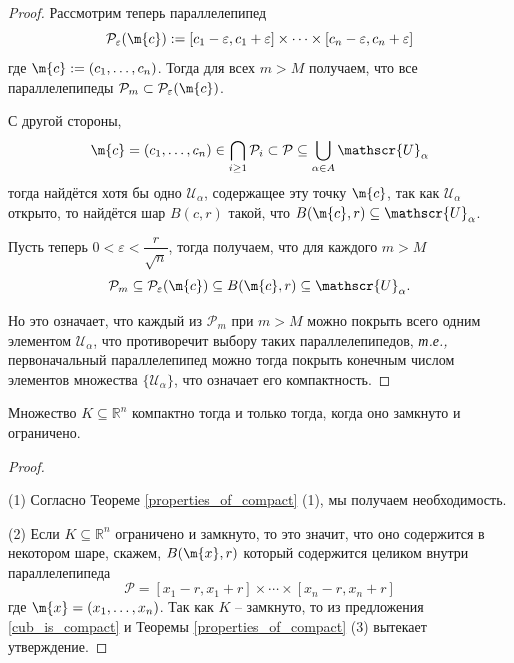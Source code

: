 \begin{proof}
Рассмотрим теперь параллелепипед
\[
 \mathcal{P}_\varepsilon(\m{c}):= [c_1 - \varepsilon, c_1 + \varepsilon] \times \cdots \times [c_n - \varepsilon, c_n + \varepsilon]
\]
где $\m{c}: = (c_1,\ldots, c_n)$. Тогда для всех $m>M$ получаем, что все параллелепипеды $\mathcal{P}_m \subset \mathcal{P}_\varepsilon(\m{c})$.

С другой стороны, 
\[
  \m{c} = (c_1,\ldots, c_n) \in \bigcap_{i \ge 1} \mathcal{P}_i \subset \mathcal{P} \subseteq \bigcup_{\alpha \in A} \mathscr{U}_\alpha
\]
тогда найдётся хотя бы одно $\mathscr{U}_\alpha$, содержащее эту точку $\m{c}$, так как $\mathscr{U}_\alpha$ открыто, то найдётся шар $B(c, r)$ такой, что $B(\m{c}, r) \subseteq \mathscr{U}_\alpha$.

Пусть теперь $0 < \varepsilon < \dfrac{r}{\sqrt{n}}$, тогда получаем, что для каждого $m>M$
\[
 \mathcal{P}_m \subseteq \mathcal{P}_\varepsilon(\m{c}) \subseteq B(\m{c}, r) \subseteq \mathscr{U}_\alpha.
\]

Но это означает, что каждый из $\mathcal{P}_m$ при $m >M$ можно покрыть всего одним элементом $\mathscr{U}_\alpha$, что противоречит выбору таких параллелепипедов, \textit{т.е.,} первоначальный параллелепипед можно тогда покрыть конечным числом элементов множества $\{\mathscr{U}_\alpha\}$, что означает его компактность.    
\end{proof}


\begin{theorem}\label{criterai_of_compacness}
Множество $K \subseteq \mathbb{R}^n$ компактно тогда и только тогда, когда оно замкнуто и ограничено.    
\end{theorem}
\begin{proof}~

(1) Согласно Теореме \ref{properties_of_compact} (1), мы получаем необходимость.

(2) Если $K \subseteq \mathbb{R}^n$ ограничено и замкнуто, то это значит, что оно содержится в некотором шаре, скажем, $B(\m{x}, r)$ который содержится целиком внутри параллелепипеда
    \[
     \mathcal{P} = [x_1- r,x_1+r] \times \cdots \times [x_n-r, x_n+r]
    \]
    где $\m{x} = (x_1, \ldots, x_n)$. Так как $K$ -- замкнуто, то из предложения \ref{cub_is_compact} и Теоремы \ref{properties_of_compact} (3) вытекает утверждение. 
\end{proof}

